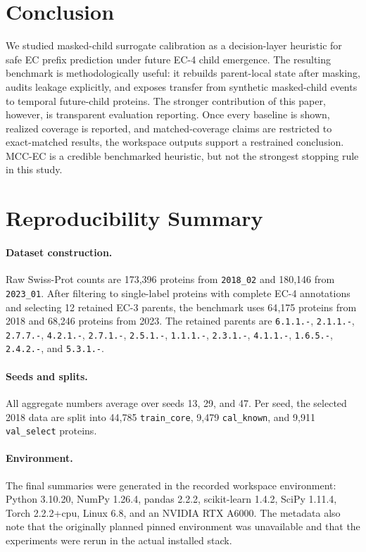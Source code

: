 \documentclass{article}
\newcommand{\method}{MCC-EC\xspace}
\begin{document}
\section{Conclusion}

We studied masked-child surrogate calibration as a decision-layer heuristic for safe EC prefix prediction under future EC-4 child emergence. The resulting benchmark is methodologically useful: it rebuilds parent-local state after masking, audits leakage explicitly, and exposes transfer from synthetic masked-child events to temporal future-child proteins. The stronger contribution of this paper, however, is transparent evaluation reporting. Once every baseline is shown, realized coverage is reported, and matched-coverage claims are restricted to exact-matched results, the workspace outputs support a restrained conclusion. \method is a credible benchmarked heuristic, but not the strongest stopping rule in this study.

\appendix

\section{Reproducibility Summary}

\paragraph{Dataset construction.}
Raw Swiss-Prot counts are 173{,}396 proteins from \texttt{2018\_02} and 180{,}146 from \texttt{2023\_01}. After filtering to single-label proteins with complete EC-4 annotations and selecting 12 retained EC-3 parents, the benchmark uses 64{,}175 proteins from 2018 and 68{,}246 proteins from 2023. The retained parents are \texttt{6.1.1.-}, \texttt{2.1.1.-}, \texttt{2.7.7.-}, \texttt{4.2.1.-}, \texttt{2.7.1.-}, \texttt{2.5.1.-}, \texttt{1.1.1.-}, \texttt{2.3.1.-}, \texttt{4.1.1.-}, \texttt{1.6.5.-}, \texttt{2.4.2.-}, and \texttt{5.3.1.-}.

\paragraph{Seeds and splits.}
All aggregate numbers average over seeds 13, 29, and 47. Per seed, the selected 2018 data are split into 44{,}785 \texttt{train\_core}, 9{,}479 \texttt{cal\_known}, and 9{,}911 \texttt{val\_select} proteins.

\paragraph{Environment.}
The final summaries were generated in the recorded workspace environment: Python 3.10.20, NumPy 1.26.4, pandas 2.2.2, scikit-learn 1.4.2, SciPy 1.11.4, Torch 2.2.2+cpu, Linux 6.8, and an NVIDIA RTX A6000. The metadata also note that the originally planned pinned environment was unavailable and that the experiments were rerun in the actual installed stack.
\end{document}
